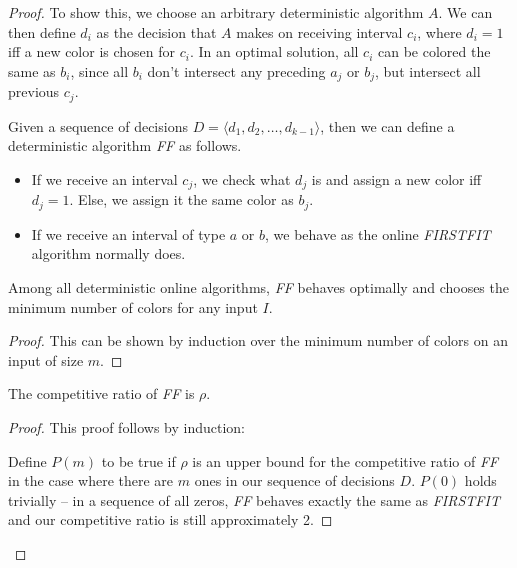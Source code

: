 \begin{proof}
To show this, we choose an arbitrary deterministic algorithm $A$. We can then define $d_i$ as the decision that $A$ makes on receiving interval $c_i$, where $d_i = 1$ iff a new color is chosen for $c_i$.  In an optimal solution, all $c_i$ can be colored the same as $b_i$, since all $b_i$ don't intersect any preceding $a_j$ or $b_j$, but intersect all previous $c_j$.  

Given a sequence of decisions $D = \langle d_1, d_2, \ldots, d_{k-1} \rangle$, then we can define a deterministic algorithm \emph{FF} as follows.

\begin{itemize}
\item If we receive an interval $c_j$, we check what $d_j$ is and assign a new color iff $d_j = 1$. Else, we assign it the same color as $b_j$. 

\item If we receive an interval of type $a$ or $b$, we behave as the online \emph{FIRSTFIT} algorithm normally does.
\end{itemize}

\begin{lemma} Among all deterministic online algorithms, \emph{FF} behaves optimally and chooses the minimum number of colors for any input $I$. \end{lemma}
\begin{proof}
This can be shown by induction over the minimum number of colors on an input of size $m$. 
\end{proof}

\begin{lemma} The competitive ratio of \emph{FF} is $\rho$. \end{lemma}
\begin{proof}
This proof follows by induction:

Define $P(m)$ to be true if $\rho$ is an upper bound for the competitive ratio of \emph{FF} in the case where there are $m$ ones in our sequence of decisions $D$.  $P(0)$ holds trivially -- in a sequence of all zeros, \emph{FF} behaves exactly the same as \emph{FIRSTFIT} and our competitive ratio is still approximately 2.


\end{proof}
\end{proof}
